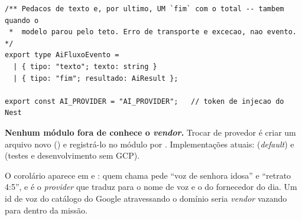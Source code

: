 \begin{lstlisting}[language=tsunoo, caption={\arq{apps/api/src/ai/provider.ts} --- a interface neutra de \emph{vendor}}, label={lst:aiprovider}]
/** Pedacos de texto e, por ultimo, UM `fim` com o total -- tambem quando o
 *  modelo parou pelo teto. Erro de transporte e excecao, nao evento. */
export type AiFluxoEvento =
  | { tipo: "texto"; texto: string }
  | { tipo: "fim"; resultado: AiResult };

export const AI_PROVIDER = "AI_PROVIDER";   // token de injecao do Nest
\end{lstlisting}

\begin{regra}
\textbf{Nenhum módulo fora de  conhece o \emph{vendor}.} Trocar de
provedor é criar um arquivo novo () e registrá-lo
no módulo por . Implementações atuais:
 (\emph{default}) e  (testes e
desenvolvimento sem GCP).

O corolário aparece em  e : quem chama pede
\enquote{voz de senhora idosa} e \enquote{retrato 4:5}, e é o \emph{provider}
que traduz para o nome de voz e o  do fornecedor do dia. Um id
de voz do catálogo do Google atravessando o domínio seria \emph{vendor} vazando
para dentro da missão.
\end{regra}

